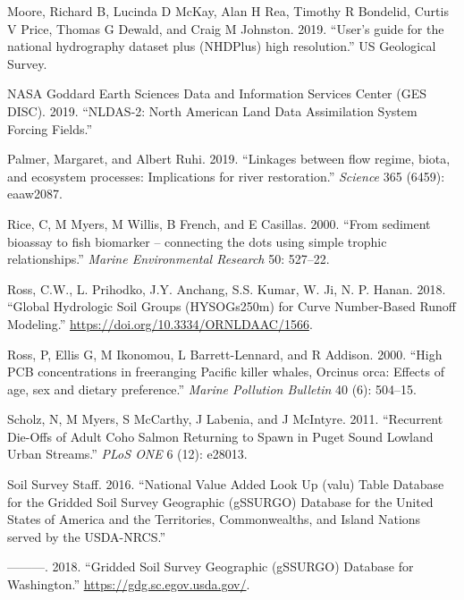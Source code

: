 \documentclass[
]{report}
\begin{document}
\leavevmode\hypertarget{ref-moore2019user}{}%
Moore, Richard B, Lucinda D McKay, Alan H Rea, Timothy R Bondelid, Curtis V Price, Thomas G Dewald, and Craig M Johnston. 2019. ``User's guide for the national hydrography dataset plus (NHDPlus) high resolution.'' US Geological Survey.

\leavevmode\hypertarget{ref-NASAGoddardEarthSciencesDataandInformationServicesCenterGESDISC2019}{}%
NASA Goddard Earth Sciences Data and Information Services Center (GES DISC). 2019. ``NLDAS-2: North American Land Data Assimilation System Forcing Fields.''

\leavevmode\hypertarget{ref-Palmer2019}{}%
Palmer, Margaret, and Albert Ruhi. 2019. ``Linkages between flow regime, biota, and ecosystem processes: Implications for river restoration.'' \emph{Science} 365 (6459): eaaw2087.

\leavevmode\hypertarget{ref-Rice2000}{}%
Rice, C, M Myers, M Willis, B French, and E Casillas. 2000. ``From sediment bioassay to fish biomarker -- connecting the dots using simple trophic relationships.'' \emph{Marine Environmental Research} 50: 527--22.

\leavevmode\hypertarget{ref-RossC.W.L.PrihodkoJ.Y.AnchangS.S.KumarW.Ji2018}{}%
Ross, C.W., L. Prihodko, J.Y. Anchang, S.S. Kumar, W. Ji, N. P. Hanan. 2018. ``Global Hydrologic Soil Groups (HYSOGs250m) for Curve Number-Based Runoff Modeling.'' \url{https://doi.org/10.3334/ORNLDAAC/1566}.

\leavevmode\hypertarget{ref-Ross2000}{}%
Ross, P, Ellis G, M Ikonomou, L Barrett-Lennard, and R Addison. 2000. ``High PCB concentrations in freeranging Pacific killer whales, Orcinus orca: Effects of age, sex and dietary preference.'' \emph{Marine Pollution Bulletin} 40 (6): 504--15.

\leavevmode\hypertarget{ref-Scholz2011}{}%
Scholz, N, M Myers, S McCarthy, J Labenia, and J McIntyre. 2011. ``Recurrent Die-Offs of Adult Coho Salmon Returning to Spawn in Puget Sound Lowland Urban Streams.'' \emph{PLoS ONE} 6 (12): e28013.

\leavevmode\hypertarget{ref-SoilSurveyStaff2016}{}%
Soil Survey Staff. 2016. ``National Value Added Look Up (valu) Table Database for the Gridded Soil Survey Geographic (gSSURGO) Database for the United States of America and the Territories, Commonwealths, and Island Nations served by the USDA-NRCS.''

\leavevmode\hypertarget{ref-SoilSurveyStaff2018}{}%
---------. 2018. ``Gridded Soil Survey Geographic (gSSURGO) Database for Washington.'' \url{https://gdg.sc.egov.usda.gov/}.
\end{document}
